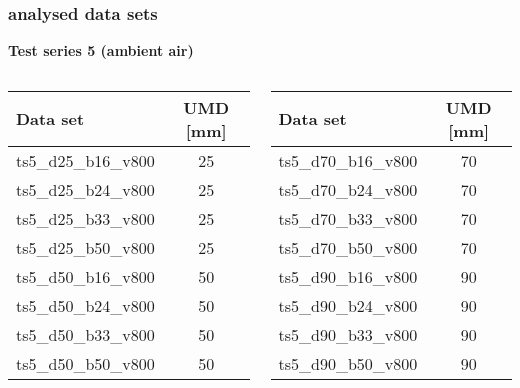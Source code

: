 	\begin{frame}
		\frametitle{\appendixname{} \textendash{} analysed data sets}\label{app:dataset:ts5}
		\textbf{Test series 5 (ambient air)}\autocite{ts5data}\\
		\vspace*{1em}
		\begin{columns}[t]
			\begin{column}{.5\textwidth}
				\begin{tabular}{l c}
					\toprule
					Data set            & UMD [mm] \\ \midrule
					ts5\_d25\_b16\_v800 & 25       \\
					ts5\_d25\_b24\_v800 & 25       \\
					ts5\_d25\_b33\_v800 & 25       \\
					ts5\_d25\_b50\_v800 & 25       \\
					ts5\_d50\_b16\_v800 & 50       \\
					ts5\_d50\_b24\_v800 & 50       \\
					ts5\_d50\_b33\_v800 & 50       \\
					ts5\_d50\_b50\_v800 & 50       \\ \bottomrule
				\end{tabular}
			\end{column}
			\begin{column}{.5\textwidth}
				\begin{tabular}{l c}
					\toprule
					Data set            & UMD [mm] \\ \midrule
					ts5\_d70\_b16\_v800 & 70       \\
					ts5\_d70\_b24\_v800 & 70       \\
					ts5\_d70\_b33\_v800 & 70       \\
					ts5\_d70\_b50\_v800 & 70       \\
					ts5\_d90\_b16\_v800 & 90       \\
					ts5\_d90\_b24\_v800 & 90       \\
					ts5\_d90\_b33\_v800 & 90       \\
					ts5\_d90\_b50\_v800 & 90       \\ \bottomrule
				\end{tabular}
			\end{column}
		\end{columns}
	\end{frame}
	
